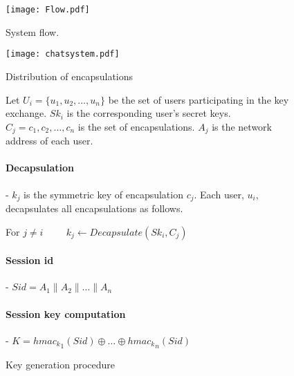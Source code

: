 \newpage
\begin{figure}[H]
\centering
\texttt{[image: Flow.pdf]}
\caption{System flow.}
\label{fig:flow}
\end{figure}


\begin{figure}[H]
\centering
\texttt{[image: chatsystem.pdf]}
\caption{Distribution of encapsulations}
\label{fig:encapdistr}
\end{figure}

\begin{figure}[H]
\begin{mdframed}
Let $U_i = \{u_1,u_2,\dots,u_n\}$ be the set of users participating in the key exchange. $Sk_i$ is the corresponding user's secret keys. $C_j = c_1,c_2,\dots,c_n$ is the set of encapsulations. $A_j$ is the network address of each user.
\paragraph{Decapsulation} - $k_j$ is the symmetric key of encapsulation $c_j$. Each user, $u_i$, decapsulates all encapsulations as follows.
\centerline{For $j\neq i \hspace{1cm}   k_j \leftarrow Decapsulate(Sk_i, C_j)$}

\paragraph{Session id} - $Sid = A_1 \parallel A_2 \parallel \dots \parallel A_n$
\paragraph{Session key computation} - $K = {hmac_k}_1(Sid) \oplus \dots \oplus {hmac_k}_n(Sid)$

\caption{Key generation procedure}\label{fig:keygen}
\end{mdframed}
\end{figure}




